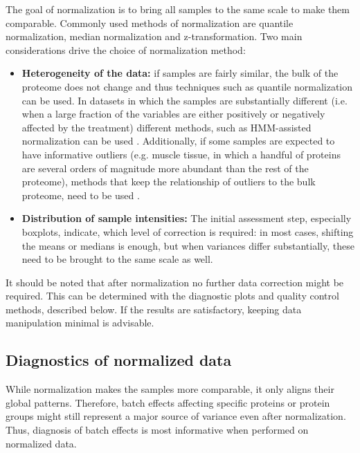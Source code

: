 \documentclass[num-refs]{wiley-article}
\begin{document}
The goal of normalization is to bring all samples to the same scale to make them comparable. Commonly used methods of normalization are quantile normalization, median normalization and z-transformation. Two main considerations drive the choice of normalization method: 

\begin{itemize}
    \item \textbf{Heterogeneity of the data: }if samples are fairly similar, the bulk of the proteome does not change and thus techniques such as quantile normalization \cite{Bolstad2003} can be used. In datasets in which the samples are substantially different (i.e. when a large fraction of the variables are either positively or negatively affected by the treatment) different methods, such as HMM-assisted normalization can be used \cite{Landfors2011}. Additionally, if some samples are expected to have informative outliers (e.g. muscle tissue, in which a handful of proteins are several orders of magnitude more abundant than the rest of the proteome), methods that keep the relationship of outliers to the bulk proteome, need to be used \cite{Wang770115}.

    \item \textbf{Distribution of sample intensities: }The initial assessment step, especially boxplots, indicate, which level of correction is required: in most cases, shifting the means or medians is enough, but when variances differ substantially, these need to be brought to the same scale as well.
\end{itemize}
It should be noted that after normalization no further data correction might be required. This can be determined with the diagnostic plots and quality control methods, described below. If the results are satisfactory, keeping data manipulation minimal is advisable.

\subsection{Diagnostics of normalized data}
While normalization makes the samples more comparable, it only aligns their global patterns. Therefore, batch effects affecting specific proteins or protein groups might still represent a major source of variance even after normalization. Thus, diagnosis of batch effects is most informative when performed on normalized data. 
\end{document}
